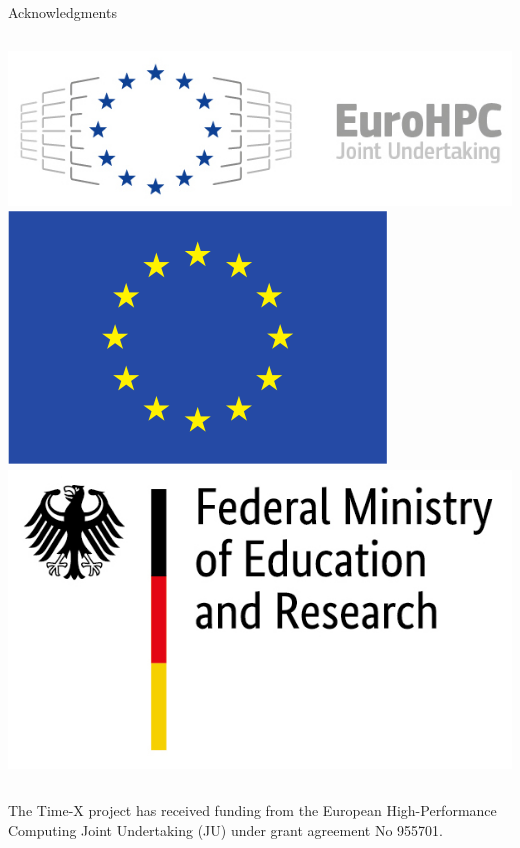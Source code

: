 \documentclass[11pt,aspectratio=43]{beamer}
\begin{document}
\begin{frame}{Acknowledgments}
	\scriptsize\vspace*{-15pt}
	\begin{columns}
		\includegraphics[width=\linewidth]{EuroHPC.jpg}
		\includegraphics[width=\linewidth]{logo_eu.png}
		\includegraphics[width=\linewidth]{BMBF_gefoerdert_2017_en.jpg}
	\end{columns}
	The Time-X project has received funding from the European High-Performance
	Computing Joint Undertaking (JU) under grant agreement No 955701.\\

\end{frame}
\end{document}
